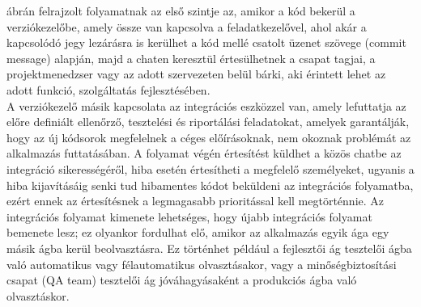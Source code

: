  ábrán felrajzolt folyamatnak az első szintje az, amikor a kód bekerül a verziókezelőbe, amely össze van kapcsolva a feladatkezelővel, ahol akár a kapcsolódó jegy lezárásra is kerülhet a kód mellé csatolt üzenet szövege (commit message) alapján, majd a chaten keresztül értesülhetnek a csapat tagjai, a projektmenedzser vagy az adott szervezeten belül bárki, aki érintett lehet az adott funkció, szolgáltatás fejlesztésében.\\
A verziókezelő másik kapcsolata az integrációs eszközzel van, amely lefuttatja az előre definiált ellenőrző, tesztelési és riportálási feladatokat, amelyek garantálják, hogy az új kódsorok megfelelnek a céges előírásoknak, nem okoznak problémát az alkalmazás futtatásában. A folyamat végén értesítést küldhet a közös chatbe az integráció sikerességéről, hiba esetén értesítheti a megfelelő személyeket, ugyanis a hiba kijavításáig senki tud hibamentes kódot beküldeni az integrációs folyamatba, ezért ennek az értesítésnek a legmagasabb prioritással kell megtörténnie. Az integrációs folyamat kimenete lehetséges, hogy újabb integrációs folyamat bemenete lesz; ez olyankor fordulhat elő, amikor az alkalmazás egyik ága egy másik ágba kerül beolvasztásra. Ez történhet például a fejlesztői ág tesztelői ágba való automatikus vagy félautomatikus olvasztásakor, vagy a minőségbiztosítási csapat (QA team) tesztelői ág jóváhagyásaként a produkciós ágba való olvasztáskor.\\
\hfill\\
